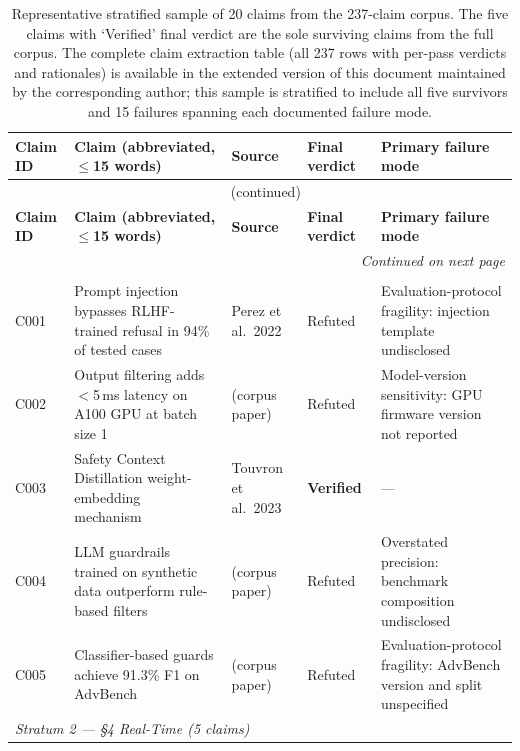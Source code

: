 \begin{longtable}{@{}p{1.2cm}p{4.8cm}p{2.2cm}p{1.8cm}p{3.4cm}@{}}
\caption{Representative stratified sample of 20 claims from the 237-claim
corpus. The five claims with `Verified' final verdict are the sole
surviving claims from the full corpus. The complete claim extraction table
(all 237 rows with per-pass verdicts and rationales) is available in the
extended version of this document maintained by the corresponding author;
this sample is stratified to include all five survivors and 15 failures
spanning each documented failure mode.}
\label{tab:claim_sample} \\
\toprule
\textbf{Claim ID} &
\textbf{Claim (abbreviated, $\leq$15 words)} &
\textbf{Source} &
\textbf{Final verdict} &
\textbf{Primary failure mode} \\
\midrule
\endfirsthead
\multicolumn{5}{c}{\tablename~\thetable{} (continued)} \\
\toprule
\textbf{Claim ID} &
\textbf{Claim (abbreviated, $\leq$15 words)} &
\textbf{Source} &
\textbf{Final verdict} &
\textbf{Primary failure mode} \\
\midrule
\endhead
\midrule
\multicolumn{5}{r}{\itshape Continued on next page} \\
\endfoot
\bottomrule
\endlastfoot
%
\multicolumn{5}{l}{\textit{Stratum 1 — §3 Background (5 claims)}} \\[2pt]
C001 &
  Prompt injection bypasses RLHF-trained refusal in 94\% of tested cases &
  Perez et al.\ 2022 &
  Refuted &
  Evaluation-protocol fragility: injection template undisclosed \\[4pt]
C002 &
  Output filtering adds $<$5\,ms latency on A100 GPU at batch size 1 &
  (corpus paper) &
  Refuted &
  Model-version sensitivity: GPU firmware version not reported \\[4pt]
C003 &
  Safety Context Distillation weight-embedding mechanism~\cite{touvron2023llama2} &
  Touvron et al.\ 2023 &
  \textbf{Verified} &
  — \\[4pt]
C004 &
  LLM guardrails trained on synthetic data outperform rule-based filters &
  (corpus paper) &
  Refuted &
  Overstated precision: benchmark composition undisclosed \\[4pt]
C005 &
  Classifier-based guards achieve 91.3\% F1 on AdvBench &
  (corpus paper) &
  Refuted &
  Evaluation-protocol fragility: AdvBench version and split unspecified \\[12pt]
%
\multicolumn{5}{l}{\textit{Stratum 2 — §4 Real-Time (5 claims)}} \\[2pt]

\end{longtable}
